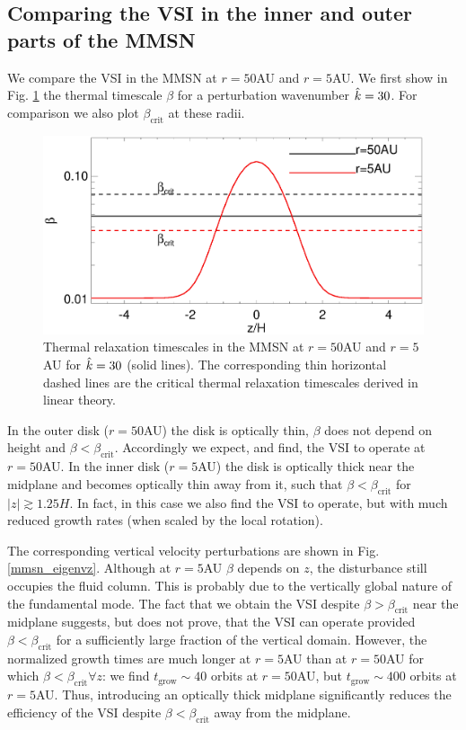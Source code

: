 \subsection{Comparing the VSI in the inner and outer parts of the MMSN} 
We compare the VSI in the MMSN at $r=50$AU and $r=5$AU. We first show in
Fig. \ref{beta_compare}  the thermal timescale $\beta$ for a
perturbation wavenumber $\hat{k}=30$. For comparison we also plot
$\beta_\mathrm{crit}$ at these radii.   

 \begin{figure}
  \includegraphics[width=\linewidth,clip=true,trim=0cm 0cm 0cm
  0cm]{figures/beta_compare}
  \caption{Thermal relaxation timescales in the MMSN at $r=50$AU
     and $r=5$AU for $\hat{k}=30$ (solid lines). The
    corresponding thin horizontal dashed lines are the critical thermal
    relaxation timescales derived in linear theory. 
    \label{beta_compare}}
\end{figure}

In the outer disk ($r=50$AU) the disk is optically thin, $\beta$ 
does not depend on height and $\beta <
\beta_\mathrm{crit}$. Accordingly we expect, and find, the VSI to
operate at $r=50$AU. In the inner disk ($r=5$AU) the disk is optically
thick near the midplane and becomes optically thin away from it, such
that $\beta < \beta_\mathrm{crit}$ for $|z|\gtrsim1.25H$. In
fact, in this case  we also find the VSI to operate, but with much
reduced growth rates (when scaled by the local 
rotation).  

The corresponding vertical velocity perturbations are shown in 
Fig. \ref{mmsn_eigenvz}. Although at $r=5$AU $\beta$ depends on $z$,
the disturbance still occupies the fluid column. This is probably due
to the vertically global nature of the fundamental mode. The fact that
we obtain the VSI despite $\beta > \beta_\mathrm{crit}$ near the
midplane suggests, but does not prove, that the VSI can operate
provided $\beta < \beta_\mathrm{crit}$ for a sufficiently large
fraction of the vertical domain. However, the normalized growth times
are much longer at $r=5$AU than at $r=50$AU for which  $\beta <
\beta_\mathrm{crit}  \forall z$: we find $t_\mathrm{grow}\sim 40$
orbits at $r=50$AU, but $t_\mathrm{grow}\sim 400$ orbits at
$r=5$AU. Thus, introducing an optically thick midplane significantly
reduces the efficiency of the VSI despite $\beta <
\beta_\mathrm{crit}$ away from the midplane.   

